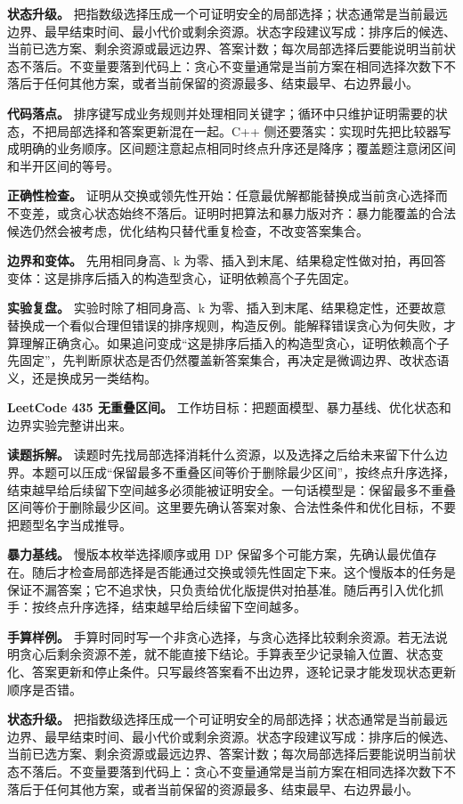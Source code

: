 \textbf{状态升级。} 把指数级选择压成一个可证明安全的局部选择；状态通常是当前最远边界、最早结束时间、最小代价或剩余资源。状态字段建议写成：排序后的候选、当前已选方案、剩余资源或最远边界、答案计数；每次局部选择后要能说明当前状态不落后。不变量要落到代码上：贪心不变量通常是当前方案在相同选择次数下不落后于任何其他方案，或者当前保留的资源最多、结束最早、右边界最小。

\textbf{代码落点。} 排序键写成业务规则并处理相同关键字；循环中只维护证明需要的状态，不把局部选择和答案更新混在一起。C++ 侧还要落实：实现时先把比较器写成明确的业务顺序。区间题注意起点相同时终点升序还是降序；覆盖题注意闭区间和半开区间的等号。

\textbf{正确性检查。} 证明从交换或领先性开始：任意最优解都能替换成当前贪心选择而不变差，或贪心状态始终不落后。证明时把算法和暴力版对齐：暴力能覆盖的合法候选仍然会被考虑，优化结构只替代重复检查，不改变答案集合。

\textbf{边界和变体。} 先用相同身高、k 为零、插入到末尾、结果稳定性做对拍，再回答变体：这是排序后插入的构造型贪心，证明依赖高个子先固定。

\textbf{实验复盘。} 实验时除了相同身高、k 为零、插入到末尾、结果稳定性，还要故意替换成一个看似合理但错误的排序规则，构造反例。能解释错误贪心为何失败，才算理解正确贪心。如果追问变成“这是排序后插入的构造型贪心，证明依赖高个子先固定”，先判断原状态是否仍然覆盖新答案集合，再决定是微调边界、改状态语义，还是换成另一类结构。

\noindent\textbf{LeetCode 435 无重叠区间。} 工作坊目标：把题面模型、暴力基线、优化状态和边界实验完整讲出来。

\textbf{读题拆解。} 读题时先找局部选择消耗什么资源，以及选择之后给未来留下什么边界。本题可以压成“保留最多不重叠区间等价于删除最少区间”，按终点升序选择，结束越早给后续留下空间越多必须能被证明安全。一句话模型是：保留最多不重叠区间等价于删除最少区间。这里要先确认答案对象、合法性条件和优化目标，不要把题型名字当成推导。

\textbf{暴力基线。} 慢版本枚举选择顺序或用 DP 保留多个可能方案，先确认最优值存在。随后才检查局部选择是否能通过交换或领先性固定下来。这个慢版本的任务是保证不漏答案；它不追求快，只负责给优化版提供对拍基准。随后再引入优化抓手：按终点升序选择，结束越早给后续留下空间越多。

\textbf{手算样例。} 手算时同时写一个非贪心选择，与贪心选择比较剩余资源。若无法说明贪心后剩余资源不差，就不能直接下结论。手算表至少记录输入位置、状态变化、答案更新和停止条件。只写最终答案看不出边界，逐轮记录才能发现状态更新顺序是否错。

\textbf{状态升级。} 把指数级选择压成一个可证明安全的局部选择；状态通常是当前最远边界、最早结束时间、最小代价或剩余资源。状态字段建议写成：排序后的候选、当前已选方案、剩余资源或最远边界、答案计数；每次局部选择后要能说明当前状态不落后。不变量要落到代码上：贪心不变量通常是当前方案在相同选择次数下不落后于任何其他方案，或者当前保留的资源最多、结束最早、右边界最小。


